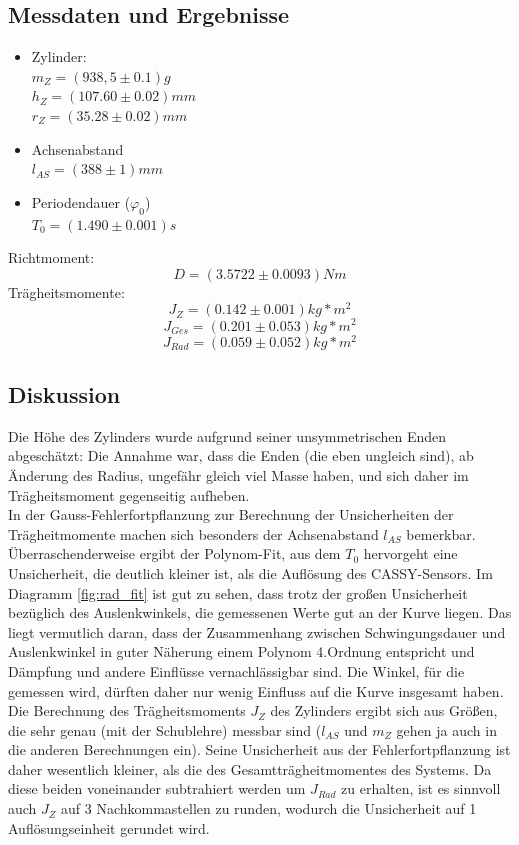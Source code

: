 \documentclass[12pt,a4paper]{article}
\begin{document}
\begin{multicols}{2}
\subsection{Messdaten und Ergebnisse}
\begin{itemize}
	\item Zylinder:\\
	$m_{Z}= (938,5 \pm 0.1)g$\\
	$h_{Z} = (107.60 \pm 0.02)mm$\\
	$r_{Z}=(35.28 \pm 0.02)mm$\\
	
	\item Achsenabstand\\
	$l_{AS}=(388\pm 1)mm$\\
	
	\item Periodendauer ($\varphi_{0}$)\\
	$T_{0}= (1.490 \pm 0.001)s$\\
	
\end{itemize}

\noindent
Richtmoment: $$D = (3.5722 \pm 0.0093)Nm$$
Trägheitsmomente:
$$J_{Z}= (0.142 \pm 0.001)kg*m^2$$
$$J_{Ges}= (0.201\pm 0.053)kg*m^2$$
$$J_{Rad}= (0.059 \pm 0.052)kg*m^2$$


\subsection{Diskussion}

Die Höhe des Zylinders wurde aufgrund seiner unsymmetrischen Enden abgeschätzt: Die Annahme war, dass die Enden (die eben ungleich sind), ab Änderung des Radius, ungefähr gleich viel Masse haben, und sich daher im Trägheitsmoment gegenseitig aufheben.\\
In der Gauss-Fehlerfortpflanzung zur Berechnung der Unsicherheiten der Trägheitmomente machen sich besonders der Achsenabstand $l_{AS}$ bemerkbar.\\
Überraschenderweise ergibt der Polynom-Fit, aus dem $T_{0}$ hervorgeht eine Unsicherheit, die deutlich kleiner ist, als die Auflösung des CASSY-Sensors. Im Diagramm \ref{fig:rad_fit} ist gut zu sehen, dass trotz der großen Unsicherheit bezüglich des Auslenkwinkels, die gemessenen Werte gut an der Kurve liegen. Das liegt vermutlich daran, dass der Zusammenhang zwischen Schwingungsdauer und Auslenkwinkel in guter Näherung einem Polynom 4.Ordnung entspricht und Dämpfung und andere Einflüsse vernachlässigbar sind. Die Winkel, für die gemessen wird, dürften daher nur wenig Einfluss auf die Kurve insgesamt haben.\\
Die Berechnung des Trägheitsmoments $J_{Z}$ des Zylinders ergibt sich aus Größen, die sehr genau (mit der Schublehre) messbar sind ($l_{AS}$ und $m_{Z}$ gehen ja auch in die anderen Berechnungen ein). Seine Unsicherheit aus der Fehlerfortpflanzung ist daher wesentlich kleiner, als die des Gesamtträgheitmomentes des Systems. Da diese beiden voneinander subtrahiert werden um $J_{Rad}$ zu erhalten, ist es sinnvoll auch $J_{Z}$ auf 3 Nachkommastellen zu runden, wodurch die Unsicherheit auf 1 Auflösungseinheit gerundet wird.



\end{multicols}
\end{document}
